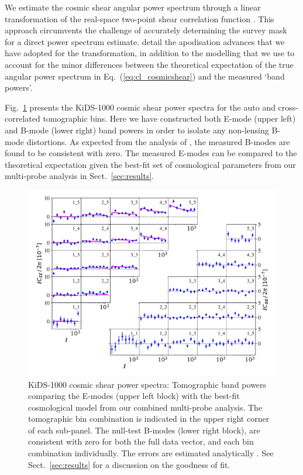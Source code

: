 We estimate the cosmic shear angular power spectrum through a linear transformation of the real-space two-point shear correlation function \citep{schneider/etal:2002}.  This approach circumvents the challenge of accurately determining the survey mask for a direct power spectrum estimate.  \citet{joachimi/etal:inprep} detail the apodisation advances that we have adopted for the transformation, in addition to the modelling that we use to account for the minor differences between the theoretical expectation of the true angular power spectrum in Eq.~(\ref{eq:cl_cosmicshear}) and the measured `band powers'.    
 
Fig.~\ref{fig:Pkk} presents the \citet{asgari/etal:inprep} KiDS-1000 cosmic shear power spectra for the auto and cross-correlated tomographic bins.   Here we have constructed both E-mode (upper left) and B-mode (lower right) band powers in order to isolate any non-lensing B-mode distortions.     As expected from the analysis of \citet{giblin/etal:inprep}, the measured B-modes are found to be consistent with zero.   The measured E-modes can be compared to the theoretical expectation given the best-fit set of cosmological parameters from our multi-probe analysis in Sect.~\ref{sec:results}.

\begin{figure}
        \includegraphics[width=\textwidth]{Data_Plots/Pkk/Pkk_K1000_2Dbins_v2_goldclasses_Flag_SOM_Fid_A.pdf}
        \caption{KiDS-1000 cosmic shear power spectra:  Tomographic
          band powers comparing the E-modes (upper left block) with the best-fit
          cosmological model from our combined multi-probe analysis.  The tomographic
        bin combination is indicated in the upper right corner of each
      sub-panel.  The null-test B-modes (lower right block), are
      consistent with zero for both the full data vector, and each
     bin combination individually.   The errors are estimated analytically \citep{joachimi/etal:inprep}.  See Sect.~\ref{sec:results} for a discussion on the goodness of fit. }
        \label{fig:Pkk}
\end{figure}


